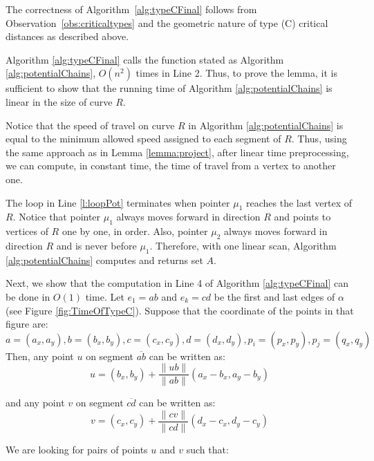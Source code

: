 \documentclass[12pt]{dalthesis}
\def\favoritefont{\bfseries \sffamily}
\def\QED{\ensuremath{{\Box}}}
\def\markatright#1{\leavevmode\unskip\nobreak\quad\hspace*{\fill}{#1}}
\newenvironment{proof}
	{\begin{trivlist}\item[\hskip\labelsep{\favoritefont Proof:}]}
	{\markatright{\QED}\end{trivlist}}
\newcommand{\Seg}[1]{{\overline{#1}}}
\begin{document}
\begin{proof}
The correctness of Algorithm~\ref{alg:typeCFinal} follows from 
 Observation~\ref{obs:criticaltypes} and 
the geometric nature of type (C) critical distances
as described above. 

Algorithm \ref{alg:typeCFinal}  calls the function stated as Algorithm
\ref{alg:potentialChains}, $O(n^2)$ times
in Line 2.
Thus, to prove the lemma, it is sufficient to show that 
the running time of Algorithm  \ref{alg:potentialChains} is linear in the size 
of curve $R$.

Notice that the speed of travel on curve $R$ in Algorithm \ref{alg:potentialChains}
is equal to the minimum allowed speed assigned to each segment of $R$.
Thus, using the same approach as 
in Lemma \ref{lemma:project}, 
after linear time preprocessing, 
we can compute, in constant time, the time 
of travel from a vertex to another one.


The loop in Line \ref{l:loopPot} terminates  
when pointer $\mu_1$ reaches the last vertex of $R$.
Notice that pointer $\mu_1$ always moves forward in direction $R$ and 
points to vertices of $R$ one by one, in order. Also,
pointer $\mu_2$  always moves forward in direction $R$ and is never 
before $\mu_1$. Therefore, with one linear scan, 
Algorithm \ref{alg:potentialChains} computes and returns set $A$.

Next, we show that the computation in Line 4 of 
Algorithm \ref{alg:typeCFinal} can be 
done in $O(1)$ time.
Let 
$e_1 = ab$ and $e_k = cd$ be the first 
and last edges of $\alpha$
(see Figure \ref{fig:TimeOfTypeC}).
Suppose that the coordinate of the points in that figure are:
\begin{displaymath}
	a=(a_x,a_y), b=(b_x,b_y), c =(c_x,c_y), d=(d_x,d_y), p_i=(p_x,p_y), p_j=(q_x,q_y)
\end{displaymath}
Then, any point $u$ on segment $\Seg{ab}$ can be written as:
\begin{displaymath}
u = (b_x,b_y) + \frac{\|ub\|}{\|ab\|} (a_x-b_x,a_y -b_y)
\end{displaymath}

and any point $v$ on segment $\Seg{cd}$ can be written as:
\begin{displaymath}
v = (c_x,c_y) + \frac{\|cv\|}{\|cd\|} (d_x-c_x,d_y -c_y)
\end{displaymath}



We are looking for pairs of points $u$  and $v$ such that:




\end{proof}
\end{document}
